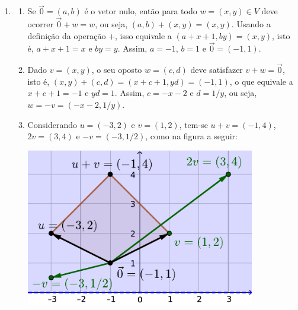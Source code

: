 \documentclass[12pt,a4paper]{article}
\begin{document}
\begin{ExerciseList}
\begin{enumerate}
\begin{center}
\end{center}
\item
\begin{enumerate}
\item Se $\vec{0} = (a,b)$ é o vetor nulo, então para todo $w = (x,y) \in V$ deve ocorrer $\vec{0}+w = w$, ou seja, $(a,b)+(x,y) = (x,y)$. Usando a definição da operação $+$, isso equivale a $(a + x + 1, b y) = (x, y)$, isto é, $a+x+1 = x$ e $by = y$. Assim, $a = -1$, $b = 1$ e $\vec{0} = (-1,1)$.
\item Dado $v = (x,y)$, o seu oposto $w = (c,d)$ deve satisfazer $v+w = \vec{0}$, isto é, $(x,y) + (c,d) = (x+c+1, yd) = (-1,1)$, o que equivale a $x+c+1=-1$ e $yd = 1$. Assim, $c=-x-2$ e $d = 1/y$, ou seja, $w = -v = (-x-2, 1/y)$.
\item Considerando $u = (-3,2)$ e $v = (1,2)$, tem-se $u+v = (-1, 4)$, $2v = (3,4)$ e $-v = (-3,1/2)$, como na figura a seguir:
\begin{center}
\includegraphics[width=10cm]{img/prova-2-pro-1bc-exemplo-ops}
\end{center}
\end{enumerate}
\end{enumerate}


\end{ExerciseList}
\end{document}
